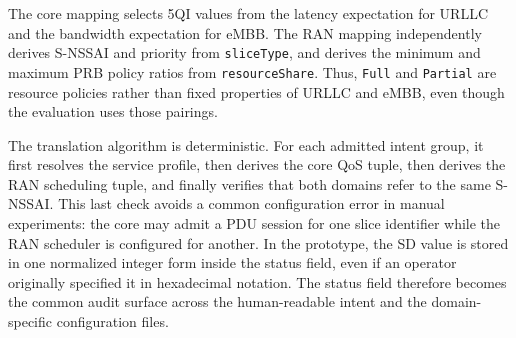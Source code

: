 \begin{table}[t]
  \caption{Complete intent-to-configuration mapping}
  \label{tab:translation}
  \scriptsize
\end{table}

The core mapping selects 5QI values from the latency expectation for URLLC and the bandwidth expectation for eMBB. The RAN mapping independently derives S-NSSAI and priority from \texttt{sliceType}, and derives the minimum and maximum PRB policy ratios from \texttt{resourceShare}. Thus, \texttt{Full} and \texttt{Partial} are resource policies rather than fixed properties of URLLC and eMBB, even though the evaluation uses those pairings.

The translation algorithm is deterministic. For each admitted intent group, it first resolves the service profile, then derives the core QoS tuple, then derives the RAN scheduling tuple, and finally verifies that both domains refer to the same S-NSSAI. This last check avoids a common configuration error in manual experiments: the core may admit a PDU session for one slice identifier while the RAN scheduler is configured for another. In the prototype, the SD value is stored in one normalized integer form inside the status field, even if an operator originally specified it in hexadecimal notation. The status field therefore becomes the common audit surface across the human-readable intent and the domain-specific configuration files.

